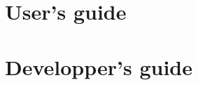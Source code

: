 \documentclass{InsightSoftwareGuide}
\newif\ifitkFullVersion
\newif\ifitkPrintedVersion
\begin{document}
\ifitkFullVersion



\fi


\part{User's guide}

\ifitkFullVersion







\fi




\part{Developper's guide}

\backmatter

%
%





%
%



\ifitkPrintedVersion
\cleardoublepage
\fi
\end{document}
